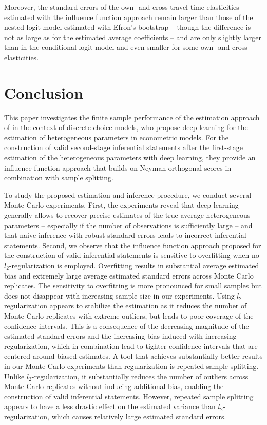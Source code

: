 \documentclass[a4paper, 12pt]{article}
\begin{document}
Moreover, the standard errors of the own- and cross-travel time elasticities estimated with the influence function approach remain larger than those of the nested logit model estimated with Efron's bootstrap -- though the difference is not as large as for the estimated average coefficients -- and are only slightly larger than in the conditional logit model and even smaller for some own- and cross-elasticities. 



\section{Conclusion}\label{secDL:conclusion}


This paper investigates the finite sample performance of the estimation approach of  in the context of discrete choice models, who propose deep learning for the estimation of heterogeneous parameters in econometric models. For the construction of valid second-stage inferential statements after the first-stage estimation of the heterogeneous parameters with deep learning, they provide an influence function approach that builds on Neyman orthogonal scores in combination with sample splitting.

To study the proposed estimation and inference procedure, we conduct several Monte Carlo experiments. First, the experiments reveal that deep learning generally allows to recover precise estimates of the true average heterogeneous parameters -- especially if the number of observations is sufficiently large -- and that naive inference with robust standard errors leads to incorrect inferential statements. Second, we observe that the influence function approach proposed for the construction of valid inferential statements is sensitive to overfitting when no $l_2$-regularization is employed. Overfitting results in substantial average estimated bias and extremely large average estimated standard errors across Monte Carlo replicates. The sensitivity to overfitting is more pronounced for small samples but does not disappear with increasing sample size in our experiments. 
Using $l_2$-regularization appears to stabilize the estimation as it reduces the number of Monte Carlo replicates with extreme outliers, but leads to poor coverage of the confidence intervals. This is a consequence of the decreasing magnitude of the estimated standard errors and the increasing bias induced with increasing regularization, which in combination lead to tighter confidence intervals that are centered around biased estimates. 
A tool that achieves substantially better results in our Monte Carlo experiments than regularization is repeated sample splitting. Unlike $l_2$-regularization, it substantially reduces the number of outliers across Monte Carlo replicates without inducing additional bias, enabling the construction of valid inferential statements. 
However, repeated sample splitting appears to have a less drastic effect on the estimated variance than $l_2$-regularization, which causes relatively large estimated standard errors.
\end{document}
